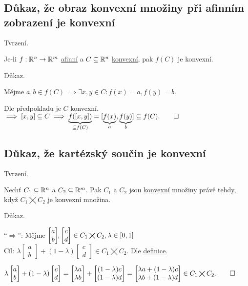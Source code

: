 \subsection{Důkaz, že obraz konvexní množiny při afinním zobrazení je konvexní}
Tvrzení.

Je-li $f: \mathbb{R}^n \rightarrow \mathbb{R}^m$ \hyperref[sec:afin]{afinní} a $C \subseteq \mathbb{R}^n$ \hyperref[sec:konvex]{konvexní}, pak
$f(C)$ je konvexní.

Důkaz.

Mějme $a, b \in f(C) \implies \exists x, y \in C: f(x)=a, f(y)=b$.

Dle předpokladu je $C$ konvexní. $\implies [x, y] \subseteq C \implies \underbrace{f([x, y])}_{\subseteq f(C)} =
[\underbrace{f(x)}_a, \underbrace{f(y)}_b] \subseteq f(C). \qed$

\subsection{Důkaz, že kartézský součin je konvexní}
Tvrzení.

Nechť $C_1 \subseteq \mathbb{R}^n$ a $C_2 \subseteq \mathbb{R}^m$. Pak $C_1$ a $C_2$ jsou \hyperref[sec:konvex]{konvexní} množiny právě tehdy, když
$C_1 \bigtimes C_2$ je konvexní množina.

Důkaz.

\enquote{$\Rightarrow$}: Mějme
$
\begin{bmatrix}
    a \\
    b
\end{bmatrix}\hspace{-1mm}\text{,}
\begin{bmatrix}
    c \\
    d
\end{bmatrix} \in C_1 \bigtimes C_2, \lambda \in [0,1]$\\
Cíl:
$
\lambda \begin{bmatrix}
    a \\
    b
\end{bmatrix}
+ (1-\lambda)
\begin{bmatrix}
    c \\
    d
\end{bmatrix} \in C_1 \bigtimes C_2.$ Dle \hyperref[sec:konvex]{definice}.

$
\lambda \begin{bmatrix}
    a \\
    b
\end{bmatrix}
+ (1-\lambda)
\begin{bmatrix}
    c \\
    d
\end{bmatrix} =
\begin{bmatrix}
    \lambda a \\
    \lambda b
\end{bmatrix}
+
\begin{bmatrix}
    (1-\lambda)c \\
    (1-\lambda)d
\end{bmatrix}
=
\begin{bmatrix} %
    \lambda a + (1-\lambda)c \\
    \lambda b + (1-\lambda)d
\end{bmatrix} \in C_1 \bigtimes C_2. \qed$

